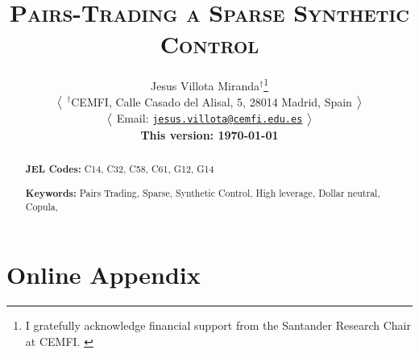 \documentclass[12pt,a4paper]{article}
\title{\textsc{
\Large 
Pairs-Trading %
a Sparse Synthetic Control 
}
}
\author[1]{
{ 
{\large Jesus Villota Miranda}$^{\dagger}$\footnote{
\scriptsize{
I gratefully acknowledge financial support from the Santander Research Chair at CEMFI.
}
}}

\bx 
{\small
$\big{<}$
\noindent $^{\dagger}$CEMFI, Calle Casado del Alisal, 5, 28014 Madrid, Spain 
$\big{>}$

$\big{<}$
Email: \href{mailto:jesus.villota@cemfi.edu.es}{\texttt{jesus.villota@cemfi.edu.es}}
$\big{>}$

\textbf{This version: \mydate\today}
}
}
\date{}
\begin{document}
\maketitle
\thispagestyle{empty}
\begin{abstract}
 

\bx 
\noindent\textbf{JEL Codes:} C14, C32, C58, C61, G12, G14

\mx 
\noindent\textbf{Keywords:} Pairs Trading, Sparse, Synthetic Control, High leverage, Dollar neutral, Copula, 
\end{abstract}

\newpage
\setcounter{page}{1}



%





%





\appendix
\section{Online Appendix}

\end{document}
